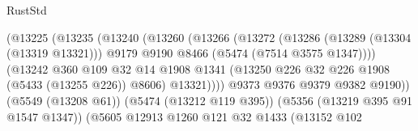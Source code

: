\begin{lexlean}{RustStd}
\begin{coremodule}
                                            (@13225
                                              (@13235
                                                (@13240
                                                  (@13260
                                                    (@13266
                                                      (@13272
                                                        (@13286
                                                          (@13289 (@13304 (@13319 @13321)))
                                                          @9179
                                                          @9190
                                                          @8466
                                                          (@5474 (@7514 @3575 @1347))))
                                                      (@13242
                                                        @360
                                                        @109
                                                        @32
                                                        @14
                                                        @1908
                                                        @1341
                                                        (@13250
                                                          @226
                                                          @32
                                                          @226
                                                          @1908
                                                          (@5433 (@13255 @226))
                                                          @8606)
                                                        @13321))))
                                                @9373
                                                @9376
                                                @9379
                                                @9382
                                                @9190))
                                            (@5549 (@13208 @61))
                                            (@5474 (@13212 @119 @395))
                                            (@5356 (@13219 @395 @91 @1547 @1347))
                                            (@5605
                                              @12913
                                              @1260
                                              @121
                                              @32
                                              @1433
                                              (@13152
                                                @102

\end{coremodule}
\end{lexlean}
